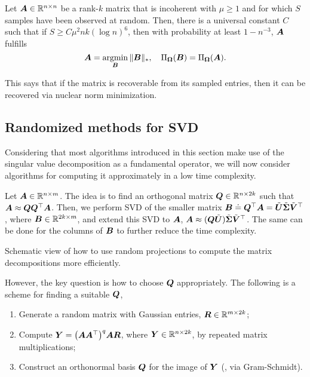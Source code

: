 \begin{theorem}
    Let $\bm{A} \in \mathbb{R}^{n \times n}$ be a rank-$k$ matrix that is incoherent with $\mu \geq 1$ and
    for which $S$ samples have been observed at random. Then, there is a universal constant $C$ such
    that if $S \geq C \mu^2 nk (\log n)^6$, then with probability at least $1 - n^{-3}$, $\bm{A}$
    fulfills \[
        \bm{A} = \operatorname*{argmin}_{\bm{B}} \| \bm{B} \|_*, \quad \Pi_{\bm{\Omega}}(\bm{B}) = \Pi_{\bm{\Omega}}(\bm{A}).
    \]
\end{theorem}

This says that if the matrix is recoverable from its sampled entries, then it can be recovered via
nuclear norm minimization.

\subsection{Randomized methods for SVD}

Considering that most algorithms introduced in this section make use of the singular value
decomposition as a fundamental operator, we will now consider algorithms for computing it
approximately in a low time complexity.

Let $\bm{A} \in \mathbb{R}^{n \times m}$. The idea is to find an orthogonal matrix $\bm{Q} \in \mathbb{R}^{n
        \times 2k}$ such that $\bm{A} \approx \bm{Q} \bm{Q}^\top \bm{A}$. Then, we perform SVD
of the smaller matrix $\bm{B} \doteq \bm{Q}^\top \bm{A} = \tilde{\bm{U}}
    \tilde{\bm{\Sigma}} \tilde{\bm{V}}^\top$, where $\bm{B} \in \mathbb{R}^{2k\times m}$, and extend
this SVD to $\bm{A}$, $\bm{A} \approx (\bm{Q} \tilde{\bm{U}}) \tilde{\bm{\Sigma}}
    \tilde{\bm{V}}^\top$. The same can be done for the columns of $\bm{B}$ to further reduce
the time complexity.

\begin{marginfigure}
    \centering
    \caption{Schematic view of how to use random projections to compute the matrix decompositions more efficiently.}
    \label{fig:random-svd}
\end{marginfigure}

However, the key question is how to choose $\bm{Q}$ appropriately. The following is a scheme for
finding a suitable $\bm{Q}$,
\begin{enumerate}
    \item Generate a random matrix with \iid Gaussian entries, $\bm{R} \in \mathbb{R}^{m \times 2k}$;
    \item Compute $\mat{Y} = \lft( \mat{A}\transpose{\mat{A}} \rgt)^q \mat{A} \mat{R}$, where $\bm{Y} \in
              \mathbb{R}^{n \times 2k}$, by repeated matrix multiplications;
    \item Construct an orthonormal basis $\bm{Q}$ for the image of $\bm{Y}$ (\eg, via Gram-Schmidt).
\end{enumerate}
